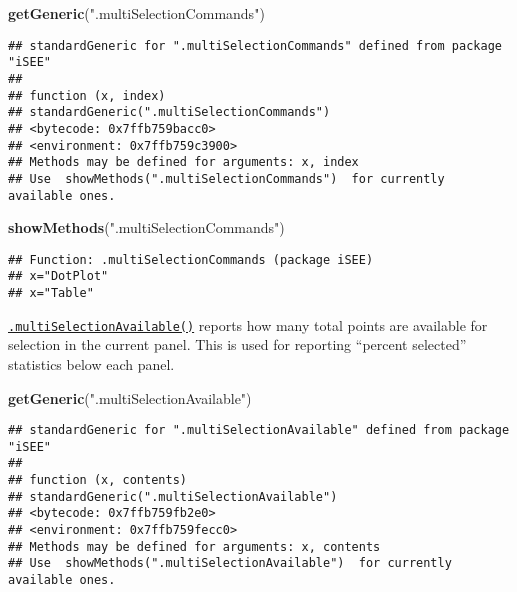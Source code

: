 \documentclass[
]{book}
\newenvironment{Shaded}{\begin{snugshade}}{\end{snugshade}}
\newcommand{\KeywordTok}[1]{\textcolor[rgb]{0.13,0.29,0.53}{\textbf{#1}}}
\newcommand{\NormalTok}[1]{#1}
\newcommand{\StringTok}[1]{\textcolor[rgb]{0.31,0.60,0.02}{#1}}
\begin{document}
\begin{Shaded}
\begin{Highlighting}[]
\KeywordTok{getGeneric}\NormalTok{(}\StringTok{".multiSelectionCommands"}\NormalTok{)}
\end{Highlighting}
\end{Shaded}

\begin{verbatim}
## standardGeneric for ".multiSelectionCommands" defined from package "iSEE"
## 
## function (x, index) 
## standardGeneric(".multiSelectionCommands")
## <bytecode: 0x7ffb759bacc0>
## <environment: 0x7ffb759c3900>
## Methods may be defined for arguments: x, index
## Use  showMethods(".multiSelectionCommands")  for currently available ones.
\end{verbatim}

\begin{Shaded}
\begin{Highlighting}[]
\KeywordTok{showMethods}\NormalTok{(}\StringTok{".multiSelectionCommands"}\NormalTok{)}
\end{Highlighting}
\end{Shaded}

\begin{verbatim}
## Function: .multiSelectionCommands (package iSEE)
## x="DotPlot"
## x="Table"
\end{verbatim}

\href{https://isee.github.io/iSEE/reference/multi-select-generics.html}{\texttt{.multiSelectionAvailable()}} reports how many total points are available for selection in the current panel.
This is used for reporting ``percent selected'' statistics below each panel.

\begin{Shaded}
\begin{Highlighting}[]
\KeywordTok{getGeneric}\NormalTok{(}\StringTok{".multiSelectionAvailable"}\NormalTok{)}
\end{Highlighting}
\end{Shaded}

\begin{verbatim}
## standardGeneric for ".multiSelectionAvailable" defined from package "iSEE"
## 
## function (x, contents) 
## standardGeneric(".multiSelectionAvailable")
## <bytecode: 0x7ffb759fb2e0>
## <environment: 0x7ffb759fecc0>
## Methods may be defined for arguments: x, contents
## Use  showMethods(".multiSelectionAvailable")  for currently available ones.
\end{verbatim}
\end{document}
